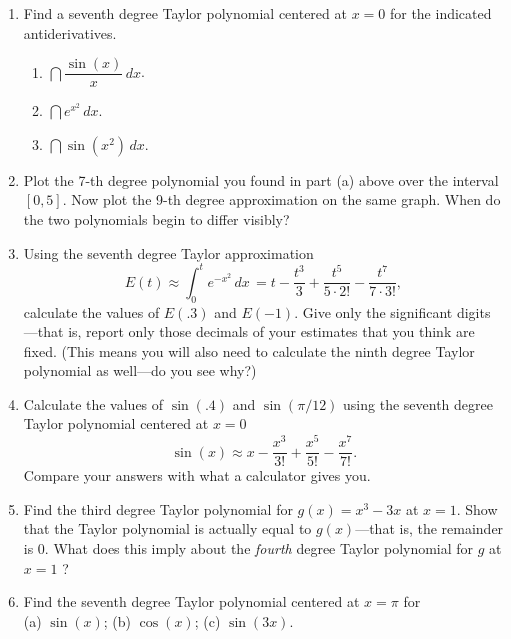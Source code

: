 \begin{enumerate}
\item Find a seventh degree Taylor polynomial centered at $x=0$ for the
indicated antiderivatives.





  \begin{enumerate}
  \item $\dint \dfrac{\sin(x)}{x} \, dx$.



  \item $\dint e^{x^2} \, dx$.

  \item $\dint \sin(x^2) \, dx$.


\end{enumerate}
\item Plot the 7-th degree polynomial you found in part (a) above over
the interval $[0, 5]$.  Now plot the 9-th degree approximation on the
same graph.  When do the two polynomials begin to differ visibly?



\item Using the seventh degree Taylor approximation
        \[
E(t) \approx \int_0^t e^{-x^2} \, dx\, 
                = t - \dfrac{t^3}{3} + \dfrac{t^5}{5 \cdot 2!} 
                - \dfrac{t^7}{7 \cdot 3!},
\]
calculate the values of $E(.3)$ and $E(-1)$.  Give only the
significant digits---that is, report only those decimals of your
estimates that you think are fixed.  (This means you will also need to
calculate the ninth degree Taylor polynomial as well---do you see
why?)


\item Calculate the values of $\sin(.4)$ and $\sin(\pi/12)$ using the
seventh degree Taylor polynomial centered at $x=0$
        \[
\sin(x) \approx x - \dfrac{x^3}{3!} + \dfrac{x^5}{5!} 
                -  \dfrac{x^7}{7!}.
\]
Compare your answers with what a calculator gives you.


\item Find the third degree Taylor polynomial for $g(x) = x^3 - 3x$ at
$x=1$.  Show that the Taylor polynomial is actually equal to
$g(x)$---that is, the remainder is 0.  What does this imply about the
     {\em fourth} degree Taylor polynomial for $g$ at $x=1$ ?


\item Find the seventh degree Taylor polynomial centered at $x=\pi$
for\\ (a) $\sin(x)$; \quad (b) $\cos(x)$; \quad (c) $\sin(3x)$.



\end{enumerate}
